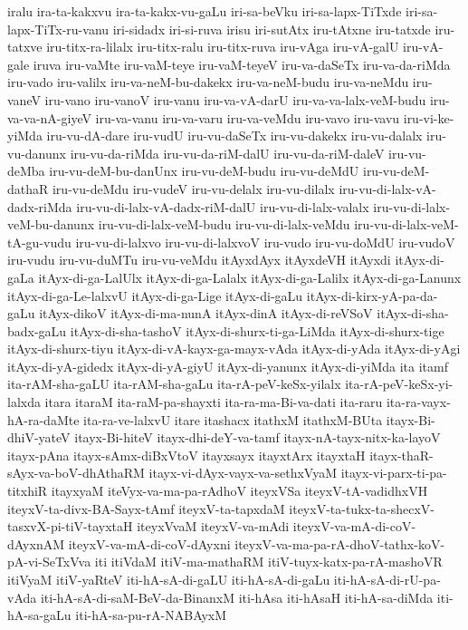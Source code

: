{iralu
ira-ta-kakxvu
ira-ta-kakx-vu-gaLu
iri-sa-beVku
iri-sa-lapx-TiTxde
iri-sa-lapx-TiTx-ru-vanu
iri-sidadx
iri-si-ruva
irisu
iri-sutAtx
iru-tAtxne
iru-tatxde
iru-tatxve
iru-titx-ra-lilalx
iru-titx-ralu
iru-titx-ruva
iru-vAga
iru-vA-galU
iru-vA-gale
iruva
iru-vaMte
iru-vaM-teye
iru-vaM-teyeV
iru-va-daSeTx
iru-va-da-riMda
iru-vado
iru-valilx
iru-va-neM-bu-dakekx
iru-va-neM-budu
iru-va-neMdu
iru-vaneV
iru-vano
iru-vanoV
iru-vanu
iru-va-vA-darU
iru-va-va-lalx-veM-budu
iru-va-va-nA-giyeV
iru-va-vanu
iru-va-varu
iru-va-veMdu
iru-vavo
iru-vavu
iru-vi-ke-yiMda
iru-vu-dA-dare
iru-vudU
iru-vu-daSeTx
iru-vu-dakekx
iru-vu-dalalx
iru-vu-danunx
iru-vu-da-riMda
iru-vu-da-riM-dalU
iru-vu-da-riM-daleV
iru-vu-deMba
iru-vu-deM-bu-danUnx
iru-vu-deM-budu
iru-vu-deMdU
iru-vu-deM-dathaR
iru-vu-deMdu
iru-vudeV
iru-vu-delalx
iru-vu-dilalx
iru-vu-di-lalx-vA-dadx-riMda
iru-vu-di-lalx-vA-dadx-riM-dalU
iru-vu-di-lalx-valalx
iru-vu-di-lalx-veM-bu-danunx
iru-vu-di-lalx-veM-budu
iru-vu-di-lalx-veMdu
iru-vu-di-lalx-veM-tA-gu-vudu
iru-vu-di-lalxvo
iru-vu-di-lalxvoV
iru-vudo
iru-vu-doMdU
iru-vudoV
iru-vudu
iru-vu-duMTu
iru-vu-veMdu
itAyxdAyx
itAyxdeVH
itAyxdi
itAyx-di-gaLa
itAyx-di-ga-LalUlx
itAyx-di-ga-Lalalx
itAyx-di-ga-Lalilx
itAyx-di-ga-Lanunx
itAyx-di-ga-Le-lalxvU
itAyx-di-ga-Lige
itAyx-di-gaLu
itAyx-di-kirx-yA-pa-da-gaLu
itAyx-dikoV
itAyx-di-ma-nunA
itAyx-dinA
itAyx-di-reVSoV
itAyx-di-sha-badx-gaLu
itAyx-di-sha-tashoV
itAyx-di-shurx-ti-ga-LiMda
itAyx-di-shurx-tige
itAyx-di-shurx-tiyu
itAyx-di-vA-kayx-ga-mayx-vAda
itAyx-di-yAda
itAyx-di-yAgi
itAyx-di-yA-gidedx
itAyx-di-yA-giyU
itAyx-di-yanunx
itAyx-di-yiMda
ita
itamf
ita-rAM-sha-gaLU
ita-rAM-sha-gaLu
ita-rA-peV-keSx-yilalx
ita-rA-peV-keSx-yi-lalxda
itara
itaraM
ita-raM-pa-shayxti
ita-ra-ma-Bi-va-dati
ita-raru
ita-ra-vayx-hA-ra-daMte
ita-ra-ve-lalxvU
itare
itashacx
itathxM
itathxM-BUta
itayx-Bi-dhiV-yateV
itayx-Bi-hiteV
itayx-dhi-deY-va-tamf
itayx-nA-tayx-nitx-ka-layoV
itayx-pAna
itayx-sAmx-diBxVtoV
itayxsayx
itayxtArx
itayxtaH
itayx-thaR-sAyx-va-boV-dhAthaRM
itayx-vi-dAyx-vayx-va-sethxVyaM
itayx-vi-parx-ti-pa-titxhiR
itayxyaM
iteVyx-va-ma-pa-rAdhoV
iteyxVSa
iteyxV-tA-vadidhxVH
iteyxV-ta-divx-BA-Sayx-tAmf
iteyxV-ta-tapxdaM
iteyxV-ta-tukx-ta-shecxV-tasxvX-pi-tiV-tayxtaH
iteyxVvaM
iteyxV-va-mAdi
iteyxV-va-mA-di-coV-dAyxnAM
iteyxV-va-mA-di-coV-dAyxni
iteyxV-va-ma-pa-rA-dhoV-tathx-koV-pA-vi-SeTxVva
iti
itiVdaM
itiV-ma-mathaRM
itiV-tuyx-katx-pa-rA-mashoVR
itiVyaM
itiV-yaRteV
iti-hA-sA-di-gaLU
iti-hA-sA-di-gaLu
iti-hA-sA-di-rU-pa-vAda
iti-hA-sA-di-saM-BeV-da-BinanxM
iti-hAsa
iti-hAsaH
iti-hA-sa-diMda
iti-hA-sa-gaLu
iti-hA-sa-pu-rA-NABAyxM
}
